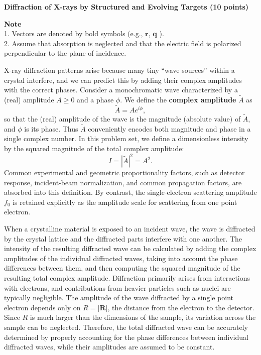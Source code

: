{\large\textbf{Diffraction of X-rays by Structured and Evolving Targets (10 points)}}

\textbf{Note}\\
1. Vectors are denoted by bold symbols (e.g., $\mathbf{r}$, $\mathbf{q}$ ).\\
2. Assume that absorption is neglected and that the electric field is polarized
perpendicular to the plane of incidence.

X-ray diffraction patterns arise because many tiny ``wave sources'' within a
crystal interfere, and we can predict this by adding their complex amplitudes
with the correct phases. Consider a monochromatic wave characterized by a
(real) amplitude $A \geq 0$ and a phase $\phi$. We define the
\textbf{complex amplitude} $\tilde{A}$ as
\[
\tilde{A} = Ae^{i\phi},
\]
so that the (real) amplitude of the wave is the magnitude (absolute value) of
$\tilde{A}$, and $\phi$ is its phase. Thus $\tilde{A}$ conveniently encodes both
magnitude and phase in a single complex number. In this problem set, we define
a dimensionless intensity by the squared magnitude of the total complex
amplitude:
\[
I = |\tilde{A}|^2 = A^2.
\]
Common experimental and geometric proportionality factors, such as detector
response, incident-beam normalization, and common propagation factors, are
absorbed into this definition. By contrast, the single-electron scattering
amplitude $f_0$ is retained explicitly as the amplitude scale for scattering
from one point electron.

When a crystalline material is exposed to an incident wave, the wave is
diffracted by the crystal lattice and the diffracted parts interfere with one
another. The intensity of the resulting diffracted wave can be calculated by
adding the complex amplitudes of the individual diffracted waves, taking into
account the phase differences between them, and then computing the squared
magnitude of the resulting total complex amplitude. Diffraction primarily
arises from interactions with electrons, and contributions from heavier
particles such as nuclei are typically negligible. The amplitude of the wave
diffracted by a single point electron depends only on $R = |\mathbf{R}|$, the
distance from the electron to the detector. Since $R$ is much larger than the
dimensions of the sample, its variation across the sample can be neglected.
Therefore, the total diffracted wave can be accurately determined by properly
accounting for the phase differences between individual diffracted waves, while
their amplitudes are assumed to be constant.

